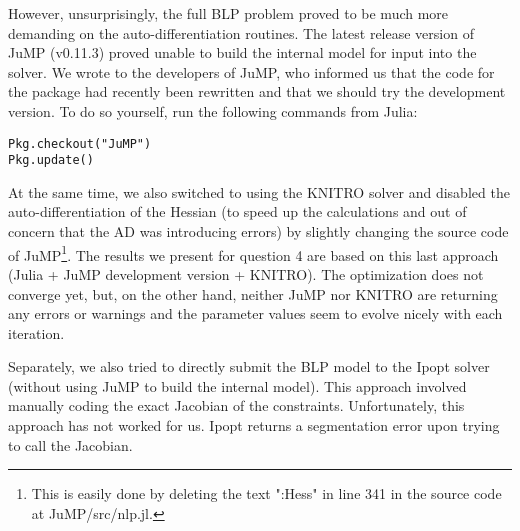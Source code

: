 \documentclass[a4paper,11pt]{article}
\begin{document}
However, unsurprisingly, the full BLP problem proved to be much more demanding on the auto-differentiation routines. The latest release version of JuMP (v0.11.3) proved unable to build the internal model for input into the solver. We wrote to the developers of JuMP, who informed us that the code for the package had recently been rewritten and that we should try the development version. To do so yourself, run the following commands from Julia:
\begin{lstlisting}
Pkg.checkout("JuMP")
Pkg.update()
\end{lstlisting}
At the same time, we also switched to using the KNITRO solver and disabled the auto-differentiation of the Hessian (to speed up the calculations and out of concern that the AD was introducing errors) by slightly changing the source code of JuMP\footnote{This is easily done by deleting the text ":Hess" in line 341 in the source code at JuMP/src/nlp.jl.}. The results we present for question 4 are based on this last approach (Julia + JuMP development version + KNITRO). The optimization does not converge yet, but, on the other hand, neither JuMP nor KNITRO are returning any errors or warnings and the parameter values seem to evolve nicely with each iteration. 

Separately, we also tried to directly submit the BLP model to the Ipopt solver (without using JuMP to build the internal model). This approach involved manually coding the exact Jacobian of the constraints. Unfortunately, this approach has not worked for us. Ipopt returns a  segmentation error upon trying to call the Jacobian.

\clearpage


\appendix
\end{document}
